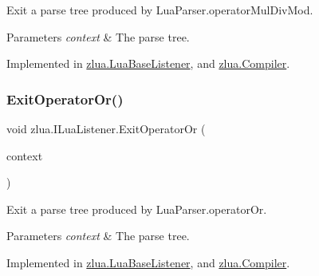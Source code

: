 Exit a parse tree produced by Lua\+Parser.\+operator\+Mul\+Div\+Mod. 


\begin{DoxyParams}{Parameters}
{\em context} & The parse tree.\\
\hline
\end{DoxyParams}


Implemented in \mbox{\hyperlink{classzlua_1_1_lua_base_listener_a686c3f75fd31a0b4c7cae3f3b99cd2aa}{zlua.\+Lua\+Base\+Listener}}, and \mbox{\hyperlink{classzlua_1_1_compiler_ab995afb210e4d04b7ebdcdd62f8f1541}{zlua.\+Compiler}}.

\mbox{\label{interfacezlua_1_1_i_lua_listener_adf5acf7049bb52ab0840b23bd5038a0a}} 
\subsubsection{\texorpdfstring{Exit\+Operator\+Or()}{ExitOperatorOr()}}
{\footnotesize\ttfamily void zlua.\+I\+Lua\+Listener.\+Exit\+Operator\+Or (\begin{DoxyParamCaption}\item[{\mbox{[}\+Not\+Null\mbox{]} \mbox{\hyperlink{classzlua_1_1_lua_parser_1_1_operator_or_context}{Lua\+Parser.\+Operator\+Or\+Context}}}]{context }\end{DoxyParamCaption})}



Exit a parse tree produced by Lua\+Parser.\+operator\+Or. 


\begin{DoxyParams}{Parameters}
{\em context} & The parse tree.\\
\hline
\end{DoxyParams}


Implemented in \mbox{\hyperlink{classzlua_1_1_lua_base_listener_ab2ff587916dcc9fe3b47ee7b560db090}{zlua.\+Lua\+Base\+Listener}}, and \mbox{\hyperlink{classzlua_1_1_compiler_a51d355ddfa730787d5353559db7acbce}{zlua.\+Compiler}}.

\mbox{\label{interfacezlua_1_1_i_lua_listener_a9047288a8f7ec003bff25c26b1d2984d}} 
